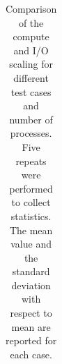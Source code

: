 \begin{table}
\begin{adjustbox}{max width=\textwidth}
\begin{tabular}{c c c c c c c c c c c c}
  \bottomrule
\end{tabular}
\end{adjustbox}
\caption
{Comparison of the compute and I/O scaling for different test cases and number of processes.
  Five repeats were performed to collect statistics.
  The mean value and the standard deviation with respect to mean are reported for each case.}
\label{tab:comp-IO-scaling}
\end{table}

